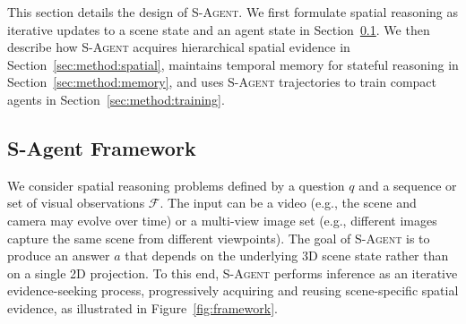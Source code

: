 \documentclass{llmxive}
\begin{document}
% 
This section details the design of \textsc{S-Agent}. 
% 
We first formulate spatial reasoning as iterative updates to a scene state and an agent state in Section~\ref{sec:method:framework}. 
% 
We then describe how \textsc{S-Agent} acquires hierarchical spatial evidence in Section~\ref{sec:method:spatial}, maintains temporal memory for stateful reasoning in Section~\ref{sec:method:memory}, and uses \textsc{S-Agent} trajectories to train compact agents in Section~\ref{sec:method:training}.

\subsection{S-Agent Framework}
\label{sec:method:framework}

We consider spatial reasoning problems defined by a question $q$ and a sequence or set of visual observations $\mathcal{F}$. 
The input can be a video (e.g., the scene and camera may evolve over time) or a multi-view image set (e.g., different images capture the same scene from different viewpoints). 
The goal of \textsc{S-Agent} is to produce an answer $a$ that depends on the underlying 3D scene state rather than on a single 2D projection.
To this end, \textsc{S-Agent} performs inference as an iterative evidence-seeking process, progressively acquiring and reusing scene-specific spatial evidence, as illustrated in Figure~\ref{fig:framework}.
\end{document}
